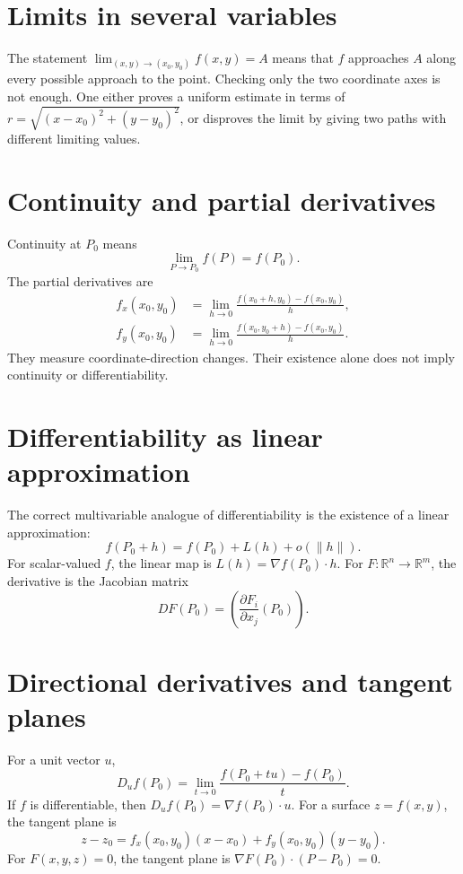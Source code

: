 

\section{Limits in several variables}

The statement $\lim_{(x,y)\to(x_0,y_0)}f(x,y)=A$ means that $f$ approaches $A$ along every possible approach to the point.  Checking only the two coordinate axes is not enough.  One either proves a uniform estimate in terms of $r=\sqrt{(x-x_0)^2+(y-y_0)^2}$, or disproves the limit by giving two paths with different limiting values.

\section{Continuity and partial derivatives}

Continuity at $P_0$ means
\[
  \lim_{P\to P_0}f(P)=f(P_0).
\]
The partial derivatives are
\[
\begin{aligned}
  f_x(x_0,y_0)&=\lim_{h\to0}\frac{f(x_0+h,y_0)-f(x_0,y_0)}h,\\
  f_y(x_0,y_0)&=\lim_{h\to0}\frac{f(x_0,y_0+h)-f(x_0,y_0)}h.
\end{aligned}
\]
They measure coordinate-direction changes.  Their existence alone does not imply continuity or differentiability.

\section{Differentiability as linear approximation}

The correct multivariable analogue of differentiability is the existence of a linear approximation:
\[
  f(P_0+h)=f(P_0)+L(h)+o(\|h\|).
\]
For scalar-valued $f$, the linear map is $L(h)=\nabla f(P_0)\cdot h$.  For $F:\mathbb R^n\to\mathbb R^m$, the derivative is the Jacobian matrix
\[
  DF(P_0)=\left(\frac{\partial F_i}{\partial x_j}(P_0)\right).
\]

\section{Directional derivatives and tangent planes}

For a unit vector $u$,
\[
  D_uf(P_0)=\lim_{t\to0}\frac{f(P_0+tu)-f(P_0)}t.
\]
If $f$ is differentiable, then $D_uf(P_0)=\nabla f(P_0)\cdot u$.  For a surface $z=f(x,y)$, the tangent plane is
\[
  z-z_0=f_x(x_0,y_0)(x-x_0)+f_y(x_0,y_0)(y-y_0).
\]
For $F(x,y,z)=0$, the tangent plane is $\nabla F(P_0)\cdot(P-P_0)=0$.




